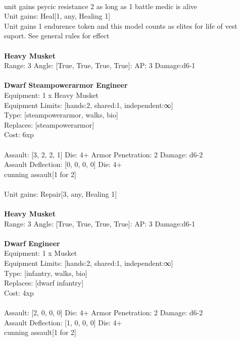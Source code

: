 \ \\
unit gains psycic resistance 2 as long as 1 battle medic is alive\\ 
Unit gains: Heal[1, any, Healing 1]\\ 
Unit gains 1 endurence token and this model counts as elites for life of vest suport. See general rules for effect\\ 

\ \\
{\bf Heavy Musket } \\



Range: 3  Angle: [True, True, True, True]: AP: 3 Damage:d6-1 \\




 
\ \\

{\bf Dwarf Steampowerarmor Engineer } \\
Equipment: 1 x Heavy Musket \\
Equipment Limits: [hands:2, shared:1, independent:∞] \\
Type: [steampowerarmor, walks, bio] \\
Replaces: [steampowerarmor] \\
Cost: 6xp\\
\ \\
Assault: [3, 2, 2, 1] Die: 4+ Armor Penetration: 2 Damage: d6-2 \\
Assault Deflection: [0, 0, 0, 0] Die: 4+\\
\indent cunning assault[1 for 2]\\ 
 
\ \\
Unit gains: Repair[3, any, Healing 1]\\ 

\ \\
{\bf Heavy Musket } \\



Range: 3  Angle: [True, True, True, True]: AP: 3 Damage:d6-1 \\




 
\ \\

{\bf Dwarf Engineer } \\
Equipment: 1 x Musket \\
Equipment Limits: [hands:2, shared:1, independent:∞] \\
Type: [infantry, walks, bio] \\
Replaces: [dwarf infantry] \\
Cost: 4xp\\
\ \\
Assault: [2, 0, 0, 0] Die: 4+ Armor Penetration: 2 Damage: d6-2 \\
Assault Deflection: [1, 0, 0, 0] Die: 4+\\
\indent cunning assault[1 for 2]\\ 
 
